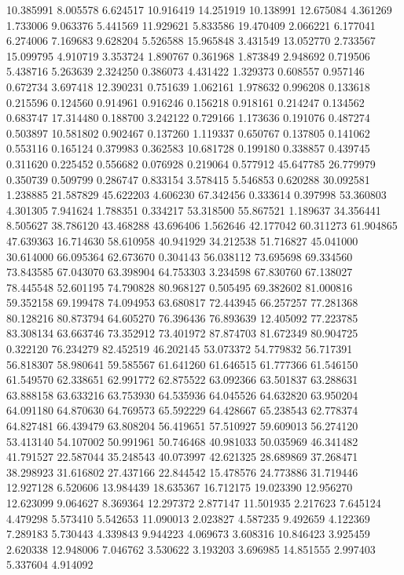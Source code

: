 10.385991
8.005578
6.624517
10.916419
14.251919
10.138991
12.675084
4.361269
1.733006
9.063376
5.441569
11.929621
5.833586
19.470409
2.066221
6.177041
6.274006
7.169683
9.628204
5.526588
15.965848
3.431549
13.052770
2.733567
15.099795
4.910719
3.353724
1.890767
0.361968
1.873849
2.948692
0.719506
5.438716
5.263639
2.324250
0.386073
4.431422
1.329373
0.608557
0.957146
0.672734
3.697418
12.390231
0.751639
1.062161
1.978632
0.996208
0.133618
0.215596
0.124560
0.914961
0.916246
0.156218
0.918161
0.214247
0.134562
0.683747
17.314480
0.188700
3.242122
0.729166
1.173636
0.191076
0.487274
0.503897
10.581802
0.902467
0.137260
1.119337
0.650767
0.137805
0.141062
0.553116
0.165124
0.379983
0.362583
10.681728
0.199180
0.338857
0.439745
0.311620
0.225452
0.556682
0.076928
0.219064
0.577912
45.647785
26.779979
0.350739
0.509799
0.286747
0.833154
3.578415
5.546853
0.620288
30.092581
1.238885
21.587829
45.622203
4.606230
67.342456
0.333614
0.397998
53.360803
4.301305
7.941624
1.788351
0.334217
53.318500
55.867521
1.189637
34.356441
8.505627
38.786120
43.468288
43.696406
1.562646
42.177042
60.311273
61.904865
47.639363
16.714630
58.610958
40.941929
34.212538
51.716827
45.041000
30.614000
66.095364
62.673670
0.304143
56.038112
73.695698
69.334560
73.843585
67.043070
63.398904
64.753303
3.234598
67.830760
67.138027
78.445548
52.601195
74.790828
80.968127
0.505495
69.382602
81.000816
59.352158
69.199478
74.094953
63.680817
72.443945
66.257257
77.281368
80.128216
80.873794
64.605270
76.396436
76.893639
12.405092
77.223785
83.308134
63.663746
73.352912
73.401972
87.874703
81.672349
80.904725
0.322120
76.234279
82.452519
46.202145
53.073372
54.779832
56.717391
56.818307
58.980641
59.585567
61.641260
61.646515
61.777366
61.546150
61.549570
62.338651
62.991772
62.875522
63.092366
63.501837
63.288631
63.888158
63.633216
63.753930
64.535936
64.045526
64.632820
63.950204
64.091180
64.870630
64.769573
65.592229
64.428667
65.238543
62.778374
64.827481
66.439479
63.808204
56.419651
57.510927
59.609013
56.274120
53.413140
54.107002
50.991961
50.746468
40.981033
50.035969
46.341482
41.791527
22.587044
35.248543
40.073997
42.621325
28.689869
37.268471
38.298923
31.616802
27.437166
22.844542
15.478576
24.773886
31.719446
12.927128
6.520606
13.984439
18.635367
16.712175
19.023390
12.956270
12.623099
9.064627
8.369364
12.297372
2.877147
11.501935
2.217623
7.645124
4.479298
5.573410
5.542653
11.090013
2.023827
4.587235
9.492659
4.122369
7.289183
5.730443
4.339843
9.944223
4.069673
3.608316
10.846423
3.925459
2.620338
12.948006
7.046762
3.530622
3.193203
3.696985
14.851555
2.997403
5.337604
4.914092
